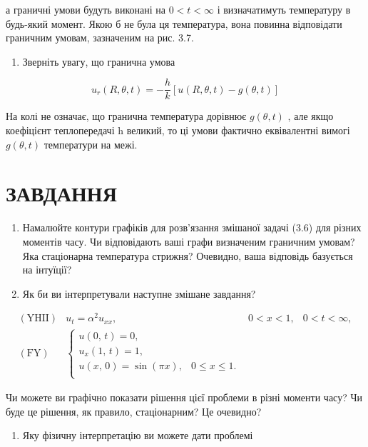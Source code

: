 \documentclass[
  ukrainian,
]{article}
\providecommand{\tightlist}{%
  \setlength{\itemsep}{0pt}\setlength{\parskip}{0pt}}
\begin{document}
а граничні умови будуть виконані на \(0 < t < \infty\) і визначатимуть
температуру в будь-який момент. Якою б не була ця температура, вона
повинна відповідати граничним умовам, зазначеним на рис. 3.7.

\begin{enumerate}
\def\labelenumi{\arabic{enumi}.}
\setcounter{enumi}{1}
\tightlist
\item
  Зверніть увагу, що гранична умова
\end{enumerate}

\[
u_r(R, \theta, t) = -\frac{h}{k} [u(R, \theta, t) - g(\theta, t)]
\]

На колі не означає, що гранична температура дорівнює \(g(\theta,t)\) ,
але якщо коефіцієнт теплопередачі h великий, то ці умови фактично
еквівалентні вимогі \(g(\theta,t)\) температури на межі.

\section{ЗАВДАННЯ}\label{ux437ux430ux432ux434ux430ux43dux43dux44f-1}

\begin{enumerate}
\def\labelenumi{\arabic{enumi}.}
\item
  Намалюйте контури графіків для розв'язання змішаної задачі (3.6) для
  різних моментів часу. Чи відповідають ваші графи визначеним граничним
  умовам? Яка стаціонарна температура стрижня? Очевидно, ваша відповідь
  базується на інтуїції?
\item
  Як би ви інтерпретували наступне змішане завдання?
\end{enumerate}

\[
\begin{aligned} (\text{YHII}) & u_t = \alpha^2 u_{xx}, & 0 < x < 1, & 0 < t < \infty, \\ (\text{FY}) & \begin{cases} u\left(0,\,t\right) = 0, \\ u_x\left(1,\,t\right) = 1, \\ u\left(x,\,0\right) = \sin\left(\pi x\right), & 0 \leqslant x \leqslant 1. \\ \end{cases} \end{aligned}
\]

Чи можете ви графічно показати рішення цієї проблеми в різні моменти
часу? Чи буде це рішення, як правило, стаціонарним? Це очевидно?

\begin{enumerate}
\def\labelenumi{\arabic{enumi}.}
\setcounter{enumi}{2}
\tightlist
\item
  Яку фізичну інтерпретацію ви можете дати проблемі
\end{enumerate}
\end{document}
